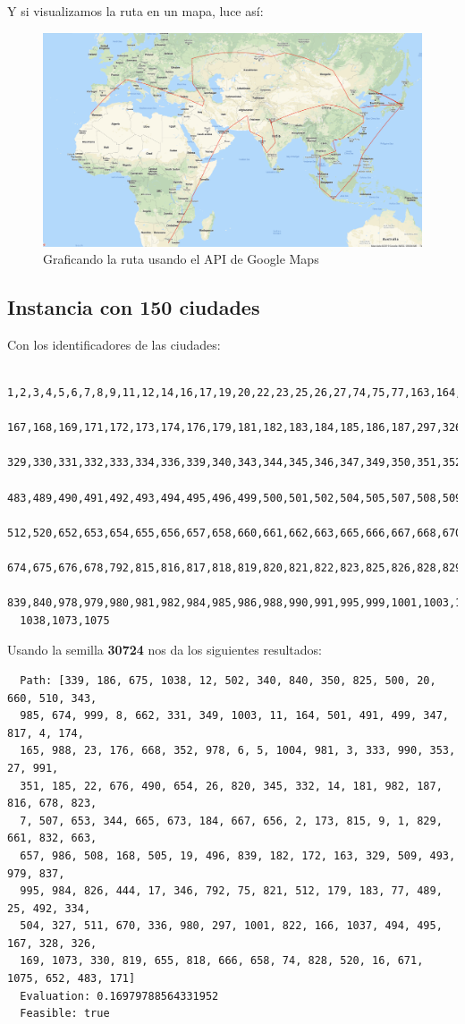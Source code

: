 \documentclass{article}
\begin{document}
Y si visualizamos la ruta en un mapa, luce así:
\begin{figure}[H]
  \centering
  \includegraphics[width=\textwidth,height=\textheight,keepaspectratio]{assets/img/tps_best_40.png}
  \caption{Graficando la ruta usando el API de Google Maps}
\end{figure}


\subsection{Instancia con 150 ciudades}
Con los identificadores de las ciudades:
\begin{verbatim}
  1,2,3,4,5,6,7,8,9,11,12,14,16,17,19,20,22,23,25,26,27,74,75,77,163,164,165,166,
  167,168,169,171,172,173,174,176,179,181,182,183,184,185,186,187,297,326,327,328,
  329,330,331,332,333,334,336,339,340,343,344,345,346,347,349,350,351,352,353,444,
  483,489,490,491,492,493,494,495,496,499,500,501,502,504,505,507,508,509,510,511,
  512,520,652,653,654,655,656,657,658,660,661,662,663,665,666,667,668,670,671,673,
  674,675,676,678,792,815,816,817,818,819,820,821,822,823,825,826,828,829,832,837,
  839,840,978,979,980,981,982,984,985,986,988,990,991,995,999,1001,1003,1004,1037,
  1038,1073,1075
\end{verbatim}

Usando la semilla \textbf{30724} nos da los siguientes resultados:
\begin{verbatim}
  Path: [339, 186, 675, 1038, 12, 502, 340, 840, 350, 825, 500, 20, 660, 510, 343, 
  985, 674, 999, 8, 662, 331, 349, 1003, 11, 164, 501, 491, 499, 347, 817, 4, 174, 
  165, 988, 23, 176, 668, 352, 978, 6, 5, 1004, 981, 3, 333, 990, 353, 27, 991, 
  351, 185, 22, 676, 490, 654, 26, 820, 345, 332, 14, 181, 982, 187, 816, 678, 823, 
  7, 507, 653, 344, 665, 673, 184, 667, 656, 2, 173, 815, 9, 1, 829, 661, 832, 663, 
  657, 986, 508, 168, 505, 19, 496, 839, 182, 172, 163, 329, 509, 493, 979, 837, 
  995, 984, 826, 444, 17, 346, 792, 75, 821, 512, 179, 183, 77, 489, 25, 492, 334, 
  504, 327, 511, 670, 336, 980, 297, 1001, 822, 166, 1037, 494, 495, 167, 328, 326, 
  169, 1073, 330, 819, 655, 818, 666, 658, 74, 828, 520, 16, 671, 1075, 652, 483, 171]
  Evaluation: 0.16979788564331952
  Feasible: true

\end{verbatim}
\end{document}
